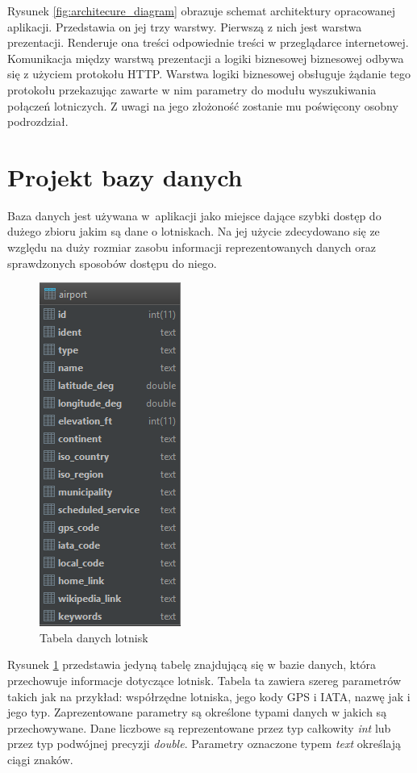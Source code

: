 \documentclass[12pt, twoside]{report}
\begin{document}
\noindent Rysunek \ref{fig:architecure_diagram} obrazuje schemat architektury opracowanej aplikacji. Przedstawia on jej trzy warstwy. Pierwszą z nich jest warstwa prezentacji. Renderuje ona treści odpowiednie treści w przeglądarce internetowej. Komunikacja między warstwą prezentacji a logiki biznesowej biznesowej odbywa się z użyciem protokołu HTTP. Warstwa logiki biznesowej obsługuje żądanie tego protokołu przekazując zawarte w nim parametry do modułu wyszukiwania połączeń lotniczych. Z uwagi na jego złożoność zostanie mu poświęcony osobny podrozdział.

\section{Projekt bazy danych}
Baza danych jest używana w~aplikacji jako miejsce dające szybki dostęp do dużego zbioru jakim są dane o lotniskach. Na jej użycie zdecydowano się ze względu na duży rozmiar zasobu informacji reprezentowanych danych oraz sprawdzonych sposobów dostępu do niego.

\begin{figure}[!ht]
\centering
\includegraphics[scale=1.00, keepaspectratio]{database.png}
\caption{Tabela danych lotnisk}
\label{fig:database}
\end{figure}

\noindent Rysunek \ref{fig:database} przedstawia jedyną tabelę znajdującą się w bazie danych, która przechowuje informacje dotyczące lotnisk. Tabela ta zawiera szereg parametrów takich jak na przykład: współrzędne lotniska, jego kody GPS i IATA, nazwę jak i jego typ. Zaprezentowane parametry są określone typami danych w jakich są przechowywane. Dane liczbowe są reprezentowane przez typ całkowity \textit{int} lub przez typ podwójnej precyzji \textit{double}. Parametry oznaczone typem \textit{text} określają ciągi znaków.
\end{document}
